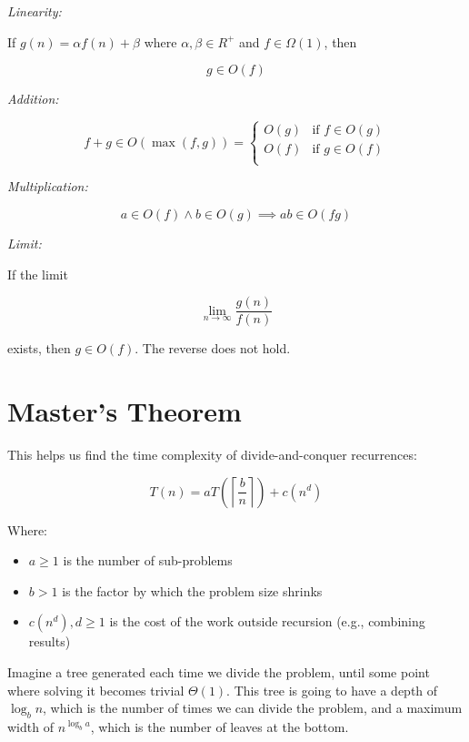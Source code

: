 \emph{Linearity:}

If \(g(n) = \alpha f(n) + \beta\) where \(\alpha, \beta \in R^+\) and \(f \in \Omega(1) \), then 

\[
    g \in O(f)
\]

\emph{Addition:}

\[
    f + g \in O(\operatorname{max}(f,g)) = 
    \begin{cases}
        O(g) &\text{if } f \in O(g) \\ 
        O(f) &\text{if } g \in O(f) \\ 
    \end{cases}
\]

\emph{Multiplication:}

\[
    a \in O(f) \land b \in O(g) \implies a b \in O(fg)
\]

\emph{Limit:}

If the limit 

\[
    \lim_{n \to \infty} \frac{g(n)}{f(n)}
\]

exists, then \(g \in O(f)\). The reverse does not hold.

\section{Master's Theorem}

This helps us find the time complexity of divide-and-conquer recurrences:  

\[
    T(n) = a T(\left\lceil\frac{b}{n}\right\rceil) + c(n^d)
\]

Where:

\begin{itemize}

    \item \(a \geq 1\) is the number of sub-problems

    \item \(b > 1\) is the factor by which the problem size shrinks

    \item \(c(n^d), d \ge 1\) is the cost of the work outside recursion (e.g., combining results)

\end{itemize}

Imagine a tree generated each time we divide the problem, until some point where solving it becomes 
trivial \(\Theta (1)\). This tree is going to have a depth of \(\log_b n\), which is the number of times 
we can divide the problem, and a maximum width of \(n^{\log_b a}\), which is the number of leaves at the bottom.

